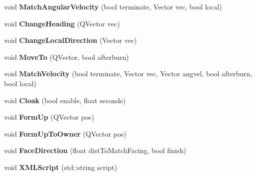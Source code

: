 \begin{DoxyCompactItemize}
\item 
void {\bfseries Match\+Angular\+Velocity} (bool terminate, Vector vec, bool local)\hypertarget{classOrders_1_1FireAt_a7ae2533fe9e7a5cdc00f1d63411b7ba1}{}\label{classOrders_1_1FireAt_a7ae2533fe9e7a5cdc00f1d63411b7ba1}

\item 
void {\bfseries Change\+Heading} (Q\+Vector vec)\hypertarget{classOrders_1_1FireAt_af31f9fca0fc2ec60e7997781ac35f31f}{}\label{classOrders_1_1FireAt_af31f9fca0fc2ec60e7997781ac35f31f}

\item 
void {\bfseries Change\+Local\+Direction} (Vector vec)\hypertarget{classOrders_1_1FireAt_a6eeba111fcefb3747ea6d04c39262366}{}\label{classOrders_1_1FireAt_a6eeba111fcefb3747ea6d04c39262366}

\item 
void {\bfseries Move\+To} (Q\+Vector, bool afterburn)\hypertarget{classOrders_1_1FireAt_a087c586eef9140ea3058de10ce1f270d}{}\label{classOrders_1_1FireAt_a087c586eef9140ea3058de10ce1f270d}

\item 
void {\bfseries Match\+Velocity} (bool terminate, Vector vec, Vector angvel, bool afterburn, bool local)\hypertarget{classOrders_1_1FireAt_abd68e0b5c2ecd90d4887986fbbc01e8e}{}\label{classOrders_1_1FireAt_abd68e0b5c2ecd90d4887986fbbc01e8e}

\item 
void {\bfseries Cloak} (bool enable, float seconds)\hypertarget{classOrders_1_1FireAt_a59159ad8a5d932926808fa5db6dc0418}{}\label{classOrders_1_1FireAt_a59159ad8a5d932926808fa5db6dc0418}

\item 
void {\bfseries Form\+Up} (Q\+Vector pos)\hypertarget{classOrders_1_1FireAt_a4cb667cd288ac35f0998feb1f6b4a062}{}\label{classOrders_1_1FireAt_a4cb667cd288ac35f0998feb1f6b4a062}

\item 
void {\bfseries Form\+Up\+To\+Owner} (Q\+Vector pos)\hypertarget{classOrders_1_1FireAt_ae5073ff68aff239d35704d141351af6b}{}\label{classOrders_1_1FireAt_ae5073ff68aff239d35704d141351af6b}

\item 
void {\bfseries Face\+Direction} (float dist\+To\+Match\+Facing, bool finish)\hypertarget{classOrders_1_1FireAt_a59ac4dbe8327b591e00abf68e7d4699a}{}\label{classOrders_1_1FireAt_a59ac4dbe8327b591e00abf68e7d4699a}

\item 
void {\bfseries X\+M\+L\+Script} (std\+::string script)\hypertarget{classOrders_1_1FireAt_a93a83a1330cfd9559657bd4ff73940e7}{}\label{classOrders_1_1FireAt_a93a83a1330cfd9559657bd4ff73940e7}


\end{DoxyCompactItemize}
